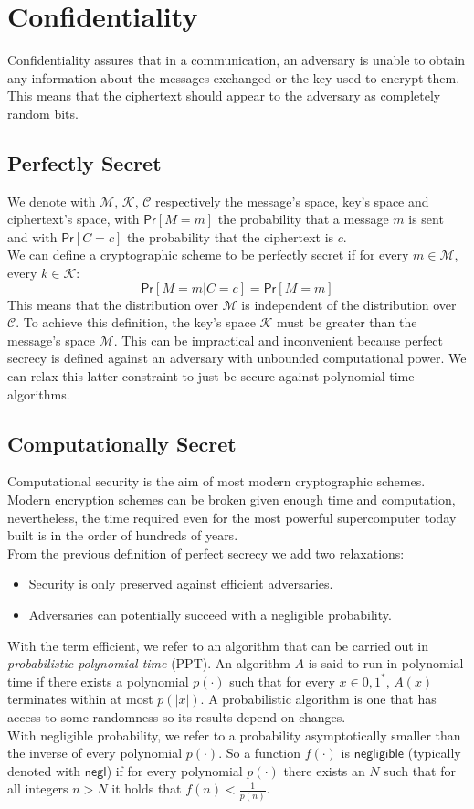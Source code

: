 \section{Confidentiality}
Confidentiality assures that in a communication, an adversary is unable to obtain any information about the messages exchanged or the key used to encrypt them. This means that the ciphertext should appear to the adversary as completely random bits.
\subsection{Perfectly Secret}
We denote with $\mathcal{M}$, $\mathcal{K}$, $\mathcal{C}$ respectively the message's space, key's space and ciphertext's space, with $\mathsf{Pr}[M = m]$ the probability that a message $m$ is sent and with $\mathsf{Pr}[C = c]$ the probability that the ciphertext is $c$.\\
We can define a cryptographic scheme to be perfectly secret if for every $m \in \mathcal{M}$, every $k \in \mathcal{K}$:
$$
    \mathsf{Pr}[M = m | C = c] = \mathsf{Pr}[M = m]
$$
This means that the distribution over $\mathcal{M}$ is independent of the distribution over $\mathcal{C}$.
To achieve this definition, the key's space $\mathcal{K}$ must be greater than the message's space $\mathcal{M}$. This can be impractical and inconvenient because perfect secrecy is defined against an adversary with unbounded computational power. We can relax this latter constraint to just be secure against polynomial-time algorithms.

\subsection{Computationally Secret}
Computational security is the aim of most modern cryptographic schemes. Modern encryption schemes can be broken given enough time and computation, nevertheless, the time required even for the most powerful supercomputer today built is in the order of hundreds of years.\\
From the previous definition of perfect secrecy we add two relaxations:
\begin{itemize}
    \item{Security is only preserved against efficient adversaries.}
    \item{Adversaries can potentially succeed with a negligible probability.}
\end{itemize}
With the term efficient, we refer to an algorithm that can be carried out in \emph{probabilistic polynomial time} (PPT). An algorithm $\mathit{A}$ is said to run in polynomial time if there exists a polynomial $p(\cdot)$ such that for every $x \in {0, 1}^*$, $\mathit{A}(x)$ terminates within at most $p(|x|)$. A probabilistic algorithm is one that has access to some randomness so its results depend on changes.\\
With negligible probability, we refer to a probability asymptotically smaller than the inverse of every polynomial $p(\cdot)$.
So a function $f(\cdot)$ is $\mathsf{negligible}$ (typically denoted with $\mathsf{negl}$) if for every polynomial $p(\cdot)$ there exists an $N$ such that for all integers $n > N$ it holds that $f(n) < \frac{1}{p(n)}$.

